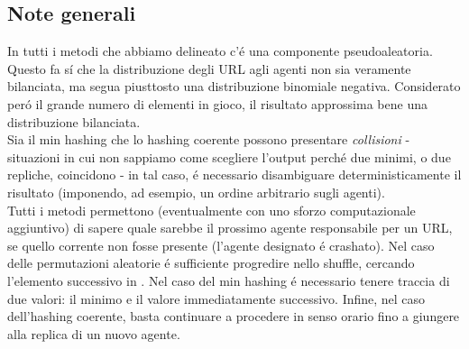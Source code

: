 \subsection{Note generali}
In tutti i metodi che abbiamo delineato c'é una componente pseudoaleatoria. Questo fa sí che la distribuzione degli URL agli agenti non sia veramente bilanciata, ma segua piusttosto una distribuzione binomiale negativa. Considerato peró il grande numero di elementi in gioco, il risultato approssima bene una distribuzione bilanciata.\\
Sia il min hashing che lo hashing coerente possono presentare \textit{collisioni} - situazioni in cui non sappiamo come scegliere l'output perché due minimi, o due repliche, coincidono - in tal caso, é necessario disambiguare deterministicamente il risultato (imponendo, ad esempio, un ordine arbitrario sugli agenti).\\
Tutti i metodi permettono (eventualmente con uno sforzo computazionale aggiuntivo) di sapere quale sarebbe il prossimo agente responsabile per un URL, se quello corrente non fosse presente (l'agente designato é crashato). Nel caso delle permutazioni aleatorie é sufficiente progredire nello shuffle, cercando l'elemento successivo in . Nel caso del min hashing é necessario tenere traccia di due valori: il minimo e il valore immediatamente successivo. Infine, nel caso dell'hashing coerente, basta continuare a procedere in senso orario fino a giungere alla replica di un nuovo agente.